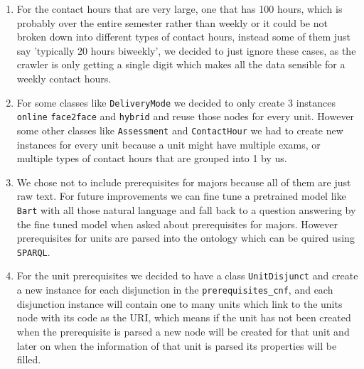 \documentclass{article}
\begin{document}
\begin{enumerate}
	\item For the contact hours that are very large, one that has 100 hours, which is probably over the entire semester rather than weekly or it could be not broken down into different types of contact hours, instead some of them just say 'typically 20 hours biweekly', we decided to just ignore these cases, as the crawler is only getting a single digit which makes all the data sensible for a weekly contact hours.
	\item For some classes like \verb|DeliveryMode| we decided to only create 3 instances \verb|online|	\verb|face2face| and \verb|hybrid| and reuse those nodes for every unit. However some other classes like \verb|Assessment| and \verb|ContactHour| we had to create new instances for every unit because a unit might have multiple exams, or multiple types of contact hours that are grouped into 1 by us.
	\item We chose not to include prerequisites for majors because all of them are just raw text. For future improvements we can fine tune a pretrained model like \verb|Bart| with all those natural language and fall back to a question answering by the fine tuned model when asked about prerequisites for majors. However prerequisites for units are parsed into the ontology which can be quired using \verb|SPARQL|.
	\item For the unit prerequisites we decided to have a class \verb|UnitDisjunct| and create a new instance for each disjunction in the \verb|prerequisites_cnf|, and each disjunction instance will contain one to many units which link to the units node with its code as the URI, which means if the unit has not been created when the prerequisite is parsed a new node will be created for that unit and later on when the information of that unit is parsed its properties will be filled.
\end{enumerate}
\end{document}

